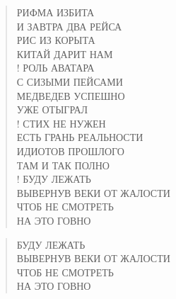 \poemtitle{***}
\begin{verse}
РИФМА ИЗБИТА\\
И ЗАВТРА ДВА РЕЙСА\\
РИС ИЗ КОРЫТА\\
КИТАЙ ДАРИТ НАМ\\!
РОЛЬ АВАТАРА\\
С СИЗЫМИ ПЕЙСАМИ\\
МЕДВЕДЕВ УСПЕШНО\\
УЖЕ ОТЫГРАЛ\\!
СТИХ НЕ НУЖЕН\\
ЕСТЬ ГРАНЬ РЕАЛЬНОСТИ\\
ИДИОТОВ ПРОШЛОГО \\
ТАМ И ТАК ПОЛНО\\!
БУДУ ЛЕЖАТЬ\\
ВЫВЕРНУВ ВЕКИ ОТ ЖАЛОСТИ\\
ЧТОБ НЕ СМОТРЕТЬ\\
НА ЭТО ГОВНО
\end{verse}

\poemtitle{***}
\begin{verse}
БУДУ ЛЕЖАТЬ\\
ВЫВЕРНУВ ВЕКИ ОТ ЖАЛОСТИ\\
ЧТОБ НЕ СМОТРЕТЬ\\
НА ЭТО ГОВНО
\end{verse}

